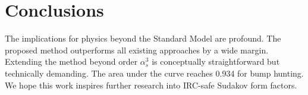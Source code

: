 \section{Conclusions}\label{sec:conclusions}

The implications for physics beyond the Standard Model are profound. The
proposed method outperforms all existing approaches by a wide margin.
Extending the method beyond order $\alpha_s^3$ is conceptually
straightforward but technically demanding. The area under the curve
reaches 0.934 for bump hunting. We hope this work inspires further
research into IRC-safe Sudakov form factors.

